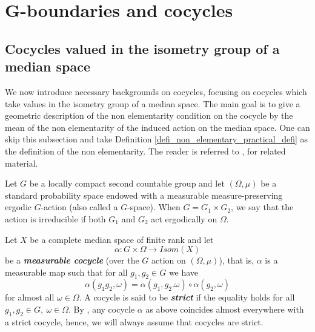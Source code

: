 \documentclass{amsart}
\numberwithin{equation}{section}
\theoremstyle{definition}
\begin{document}
\section{G-boundaries and cocycles}\label{section_strongboundaries_cocycles}


\subsection{Cocycles valued in the isometry group of a median space}

We now introduce necessary backgrounds on cocycles, focusing on cocycles which take values in the isometry group of a median space. The main goal is to give a geometric description of the non elementarity condition on the cocycle by the mean of the non elementarity of the induced action on the median space. One can skip this subsection and take Definition \ref{defi_non_elementary_practical_defi} as the definition of the non elementarity. The reader is referred to \cite{BaderFurman}, \cite{Furstenberg-Bourbaki} for related material.\par 
Let $G$ be a locally compact second countable group and let $(\Omega,\mu)$ be a standard probability space endowed with a measurable measure-preserving ergodic $G$-action (also called a $G$-space). When $G=G_1\times G_2$, we say that the action is irreducible if both $G_1$ and $G_2$ act ergodically on $\Omega$.  %

\par Let $X$ be a complete median space of finite rank and let 
\[
\alpha:G\times \Omega\rightarrow Isom(X)
\]
be a \textbf{\textit{measurable cocycle}} (over the $G$ action on $(\Omega,\mu)$), that is, $\alpha$ is a measurable map such that for  all $g_1,g_2\in G$ we have $$\alpha(g_1g_2,\omega)=\alpha(g_1,g_2.\omega)\circ \alpha(g_2,\omega)$$ for almost all $\omega\in\Omega$. A cocycle is said to be \textbf{\textit{strict}} if the equality holds for all $g_1,g_2\in G,\ \omega\in \Omega$. By \cite[Appendix B]{Zimmer}, any cocycle $\alpha$ as above coincides almost everywhere with a strict cocycle, hence, we will always assume that cocycles are strict.\par 
\end{document}
